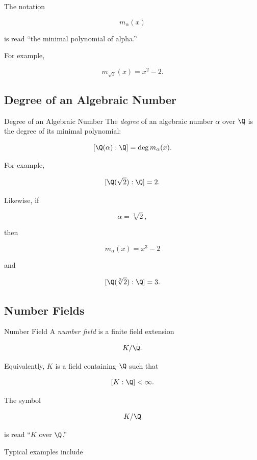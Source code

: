 The notation

\[ m_\alpha(x) \]

is read ``the minimal polynomial of alpha.''

For example,

\[ m_{\sqrt2}(x)=x^2-2. \]

\subsection{Degree of an Algebraic Number}
\label{subsec:degree-algebraic-number}

\begin{definitionbox}{Degree of an Algebraic Number}
The \emph{degree} of an algebraic number \(\alpha\) over \(\Q\) is the degree
of its minimal polynomial:

\[ [\Q(\alpha):\Q]=\deg m_\alpha(x). \]
\end{definitionbox}

For example,

\[ [\Q(\sqrt2):\Q]=2. \]

Likewise, if

\[ \alpha=\sqrt[3]{2}, \]

then

\[ m_\alpha(x)=x^3-2 \]

and

\[ [\Q(\sqrt[3]{2}):\Q]=3. \]

\subsection{Number Fields}
\label{subsec:number-fields}

\begin{definitionbox}{Number Field}
A \emph{number field} is a finite field extension

\[ K/\Q. \]

Equivalently, \(K\) is a field containing \(\Q\) such that

\[ [K:\Q]<\infty. \]
\end{definitionbox}

The symbol

\[ K/\Q \]

is read ``\(K\) over \(\Q\).''

Typical examples include

